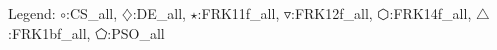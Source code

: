 Legend: {\color{NavyBlue}$\circ$}:CS\_all, {\color{Magenta}$\diamondsuit$}:DE\_all, {\color{Orange}$\star$}:FRK11f\_all, {\color{CornflowerBlue}$\triangledown$}:FRK12f\_all, {\color{red}$\varhexagon$}:FRK14f\_all, {\color{YellowGreen}$\triangle$}:FRK1bf\_all, {\color{cyan}$\pentagon$}:PSO\_all